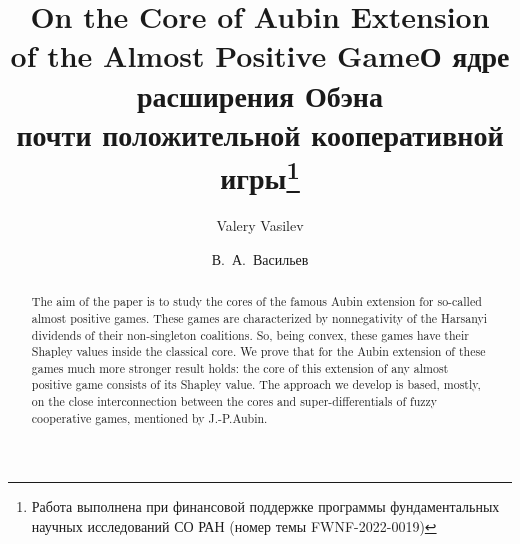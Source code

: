 \begin{englishtitle} %
\title{On the Core of Aubin Extension \\ of the Almost Positive Game}
\author{Valery Vasilev 
}
\institute{Sobolev Institute of Mathematics, Novosibirsk, Russia \\
\email{vasilev@math.nsc.ru}
}
\maketitle
\begin{abstract}
The aim of the paper is to study the cores of the
famous Aubin extension for so-called almost positive games.
These games are characterized by nonnegativity of the
Harsanyi dividends of their non-singleton coalitions. So, being convex, these games have their
Shapley values inside the classical core. We prove that for the Aubin extension of these games
much more stronger result holds: the core of this
extension of any almost positive game consists of its Shapley value. The approach we develop
is based, mostly, on the close interconnection between the cores and super-differentials of fuzzy
cooperative games, mentioned by J.-P.Aubin.

\end{abstract}
\end{englishtitle}

\iffalse
\documentclass[12pt]{llncs}


\usepackage{iftex}

\ifPDFTeX
\usepackage[T2A]{fontenc}
\usepackage[utf8]{inputenc} %
\usepackage[english,russian]{babel}
\fi

\usepackage{todonotes}

\usepackage[russian]{nla}


\fi


\title{О ядре расширения Обэна \\ почти положительной кооперативной игры\thanks{Работа выполнена при финансовой поддержке программы фундаментальных научных исследований СО РАН (номер темы FWNF-2022-0019)}}
\author{В.~А.~Васильев   %
} %

